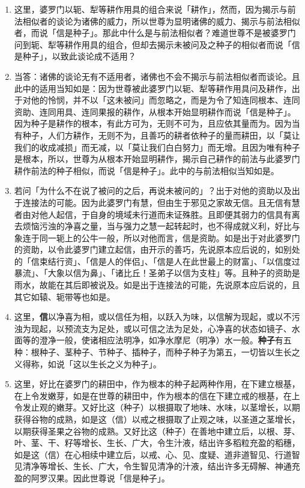 \begin{enumerate}\item 这里，婆罗门以轭、犁等耕作用具的组合来说「耕作」，然而，因为揭示与前法相似者的谈论为诸佛的威力，所以世尊为显明诸佛的威力、揭示与前法相似者，而说「信是种子」。那此中什么是与前法相似者？难道世尊不是被婆罗门问到轭、犁等耕作用具的组合，但却去揭示未被问及之种子的相似者而说「信是种子」，以致此谈论成不适用？
\item 当答：诸佛的谈论无有不适用者，诸佛也不会不揭示与前法相似者而谈论。且此中的适用当知如是：因为世尊被此婆罗门以轭、犁等耕作用具问及耕作，出于对他的怜悯，并不以「这未被问」而忽略之，而是为令了知连同根本、连同资助、连同用具、连同果报的耕作，从根本开始显明耕作而说「信是种子」。因为种子是耕作的根本，有此方可为，无则不可为，且应依其量而为。因为当有种子，人们方耕作，无则不为，且善巧的耕者依种子的量而耕田，以「莫让我们的收成减损」而无减，以「莫让我们白白努力」而无增。且因为唯有种子是根本，所以，世尊为从根本开始显明耕作，揭示自己耕作的前法与此婆罗门耕作前法的种子相似，而说「信是种子」。此中的与前法相似当知如是。
\item 若问「为什么不在说了被问的之后，再说未被问的」？出于对他的资助以及出于连接法的可能。因为此婆罗门有慧，但由生于邪见之家故无信。且无信有慧者由对他人起信，于自身的境域未行道而未证殊胜。且即便其弱力的信具有离去烦恼污浊的净喜之量，当与强力之慧一起转起时，也不得成就义利，好比与象连于同一轭上的公牛一般，所以对他而言，信是资助。如是出于对此婆罗门的资助，以令此婆罗门建立起信，由开示的善巧，先说原本应后说的，如别处的「信束结行资」、「信是人的伴侣」、「信是人在此世最上的财富」、「以信度过暴流」、「大象以信为鼻」、「诸比丘！圣弟子以信为支柱」等。且种子的资助是雨水，故能在其后即被说及。如是出于连接法的可能，先说原本应后说的，且其它如辕、轭带等也如是。
\item 这里，\textbf{信}以净喜为相，或以信任为相，以跃入为味，以信解为现起，或以不污浊为现起，以预流支为足处，或以可信之法为足处，心净喜的状态如镜子、水面等的澄净一般，使诸相应法明净，如净水摩尼（明净）水一般。\textbf{种子}有五种：根种子、茎种子、节种子、插种子，而种子种子为第五，一切皆以生长之义得称，如说「这以生长之义为种子」。
\item 这里，好比在婆罗门的耕田中，作为根本的种子起两种作用，在下建立根基，在上令发嫩芽，如是在世尊的耕田中，作为根本的信在下建立戒的根基，在上令发止观的嫩芽。又好比这（种子）以根摄取了地味、水味，以茎增长，以期获得谷物的成熟，如是这（信）以戒之根摄取了止观之味，以圣道之茎增长，以期获得圣果之谷物的成熟。又好比这（种子）在善地中建立后，以根、芽、叶、茎、干、籽等增长、生长、广大，令生汁液，结出许多稻粒充盈的稻穗，如是这（信）在心相续中建立后，以戒、心、见、度疑、道非道智见、行道智见清净等增长、生长、广大，令生智见清净的汁液，结出许多无碍解、神通充盈的阿罗汉果。因此世尊说「信是种子」。

\end{enumerate}
